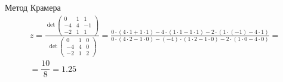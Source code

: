 \begin{frame} {Метод Крамера}
\begin{multline*}
z=\frac{\det\left(\begin{array}{lll} 
0 & 1 & 1 \\
-4 & 4 & -1\\
-2 & 1 & 1
\end{array}\right)}{\det\left(\begin{array}{lll} 
0 & 1 & 0 \\
-4 & 4 & 0\\
-2 & 1 & 2
\end{array}\right)}
=\frac{0\cdot(4\cdot 1 + 1 \cdot 1)-4\cdot(1\cdot1 -1\cdot1)-2\cdot(1\cdot(-1)-4 \cdot 1)}{0\cdot(4\cdot 2-1\cdot 0)-(-4)\cdot(1\cdot2-1\cdot0) -2\cdot(1\cdot 0 -4 \cdot 0)}=\\=\dfrac{10}{8}=1.25\\
\end{multline*}
\end{frame}


